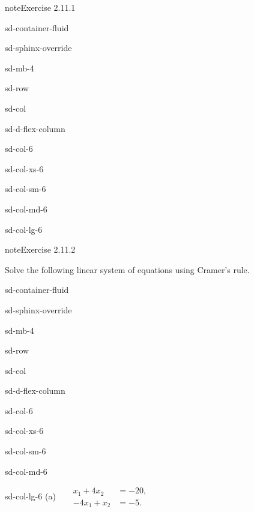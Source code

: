 \documentclass[letterpaper,10pt,english]{jupyterBook}
\begin{document}
\begin{sphinxadmonition}{note}{Exercise 2.11.1}
\begin{sphinxuseclass}{sd-container-fluid}
\begin{sphinxuseclass}{sd-sphinx-override}
\begin{sphinxuseclass}{sd-mb-4}
\begin{sphinxuseclass}{sd-row}
\begin{sphinxuseclass}{sd-col}
\begin{sphinxuseclass}{sd-d-flex-column}
\begin{sphinxuseclass}{sd-col-6}
\begin{sphinxuseclass}{sd-col-xs-6}
\begin{sphinxuseclass}{sd-col-sm-6}
\begin{sphinxuseclass}{sd-col-md-6}
\begin{sphinxuseclass}{sd-col-lg-6}
\end{sphinxuseclass}
\end{sphinxuseclass}
\end{sphinxuseclass}
\end{sphinxuseclass}
\end{sphinxuseclass}
\end{sphinxuseclass}
\end{sphinxuseclass}
\end{sphinxuseclass}
\end{sphinxuseclass}
\end{sphinxuseclass}
\end{sphinxuseclass}\end{sphinxadmonition}
 \label{exercise:systems-ex-cramer}

\begin{sphinxadmonition}{note}{Exercise 2.11.2}



\sphinxAtStartPar
Solve the following linear system of equations using Cramer’s rule.

\begin{sphinxuseclass}{sd-container-fluid}
\begin{sphinxuseclass}{sd-sphinx-override}
\begin{sphinxuseclass}{sd-mb-4}
\begin{sphinxuseclass}{sd-row}
\begin{sphinxuseclass}{sd-col}
\begin{sphinxuseclass}{sd-d-flex-column}
\begin{sphinxuseclass}{sd-col-6}
\begin{sphinxuseclass}{sd-col-xs-6}
\begin{sphinxuseclass}{sd-col-sm-6}
\begin{sphinxuseclass}{sd-col-md-6}
\begin{sphinxuseclass}{sd-col-lg-6}
\sphinxAtStartPar
(a)  
\( \begin{align*}
     x_{1} + 4 x_{2} &= -20, \\
     - 4 x_{1} +  x_{2} &= -5.
\end{align*} \)


\end{sphinxuseclass}
\end{sphinxuseclass}
\end{sphinxuseclass}
\end{sphinxuseclass}
\end{sphinxuseclass}
\end{sphinxuseclass}
\end{sphinxuseclass}
\end{sphinxuseclass}
\end{sphinxuseclass}
\end{sphinxuseclass}
\end{sphinxuseclass}
\end{sphinxadmonition}
\end{document}

